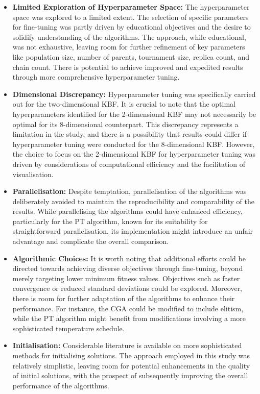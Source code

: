 \documentclass[10pt]{article}
\begin{document}
\begin{multicols}{2}
\begin{itemize}
    \item \textbf{Limited Exploration of Hyperparameter Space:} The hyperparameter space was explored to a limited extent. The selection of specific parameters for fine-tuning was partly driven by educational objectives and the desire to solidify understanding of the algorithms. The approach, while educational, was not exhaustive, leaving room for further refinement of key parameters like population size, number of parents, tournament size, replica count, and chain count. There is potential to achieve improved and expedited results through more comprehensive hyperparameter tuning.
    \item \textbf{Dimensional Discrepancy:} Hyperparameter tuning was specifically carried out for the two-dimensional KBF. It is crucial to note that the optimal hyperparameters identified for the 2-dimensional KBF may not necessarily be optimal for its 8-dimensional counterpart. This discrepancy represents a limitation in the study, and there is a possibility that results could differ if hyperparameter tuning were conducted for the 8-dimensional KBF. However, the choice to focus on the 2-dimensional KBF for hyperparameter tuning was driven by considerations of computational efficiency and the facilitation of visualisation.
    \item \textbf{Parallelisation:} Despite temptation, parallelisation of the algorithms was deliberately avoided to maintain the reproducibility and comparability of the results. While parallelising the algorithms could have enhanced efficiency, particularly for the PT algorithm, known for its suitability for straightforward parallelisation, its implementation might introduce an unfair advantage and complicate the overall comparison.
    \item \textbf{Algorithmic Choices:} It is worth noting that additional efforts could be directed towards achieving diverse objectives through fine-tuning, beyond merely targeting lower minimum fitness values. Objectives such as faster convergence or reduced standard deviations could be explored. Moreover, there is room for further adaptation of the algorithms to enhance their performance. For instance, the CGA could be modified to include elitism, while the PT algorithm might benefit from modifications involving a more sophisticated temperature schedule.
    \item \textbf{Initialisation:} Considerable literature is available on more sophisticated methods for initialising solutions. The approach employed in this study was relatively simplistic, leaving room for potential enhancements in the quality of initial solutions, with the prospect of subsequently improving the overall performance of the algorithms.

\end{itemize}
\end{multicols}
\end{document}
